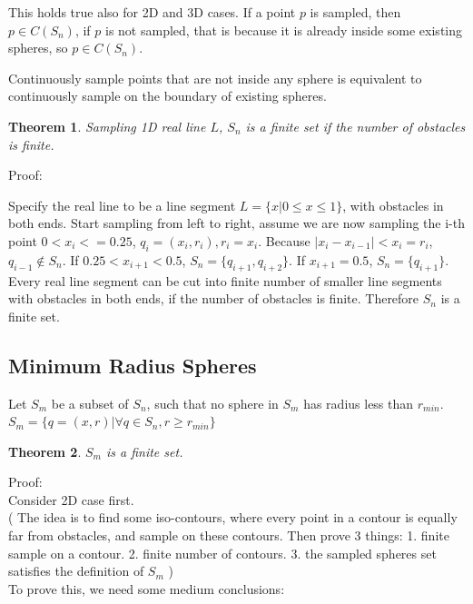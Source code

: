 \documentclass[12pt]{article}
\newtheorem{theorem}{Theorem}[section]
\begin{document}
  This holds true also for 2D and 3D cases. If a point $p$ is sampled, then $p \in C(S_{n})$, if $p$ is not sampled, that is because it is already inside some existing spheres, so $p \in C(S_{n})$.
  
  Continuously sample points that are not inside any sphere is equivalent to continuously sample on the boundary of existing spheres.

  \begin{theorem}
  Sampling 1D real line $L$, $S_n$ is a finite set if the number of obstacles is finite.
  \end{theorem}
  
  Proof:
  
  Specify the real line to be a line segment $L = \{ x| 0 \leq x \leq 1 \}$, with obstacles in both ends. Start sampling from left to right, assume we are now sampling the i-th point $0 < x_i <= 0.25$, $q_i = (x_i, r_i), r_i = x_i$. Because $|x_{i} - x_{i-1}| < x_i = r_i$, $q_{i-1} \notin S_n$. If $0.25 < x_{i+1} < 0.5$, $S_n = \{ q_{i+1}, q_{i+2} \}$. If $x_{i+1} = 0.5$, $S_n = \{ q_{i+1} \}$. Every real line segment can be cut into finite number of smaller line segments with obstacles in both ends, if the number of obstacles is finite. Therefore $S_n$ is a finite set.
  
  \subsection{Minimum Radius Spheres}
  
  Let $S_m$ be a subset of $S_n$, such that no sphere in $S_m$ has radius less than $r_{min}$. $S_m = \{ q=(x,r) | \forall q \in S_n, r \geq r_{min} \}$  

  \begin{theorem}
  $S_m$ is a finite set.
  \end{theorem}

  Proof:\\

  Consider 2D case first.\\
  
  ( The idea is to find some iso-contours, where every point in a contour is equally far from obstacles, and sample on these contours. Then prove 3 things: 1. finite sample on a contour. 2. finite number of contours. 3. the sampled spheres set satisfies the definition of $S_m$ )  \\
  
  To prove this, we need some medium conclusions: \\
  
\end{document}
